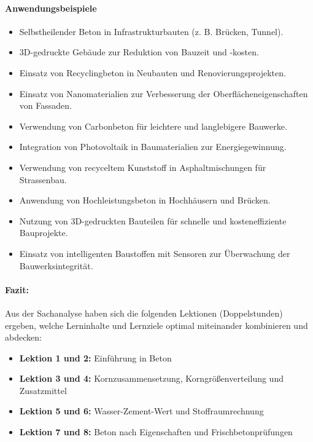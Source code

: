 \documentclass[
11pt,
captions=tableheading,
smallheadings,
headsepline,
footsepline, 
parskip=half-,
]{scrartcl}
\begin{document}
\paragraph{Anwendungsbeispiele}
\begin{itemize}
    \item Selbstheilender Beton in Infrastrukturbauten (z. B. Brücken, Tunnel).
    \item 3D-gedruckte Gebäude zur Reduktion von Bauzeit und -kosten.
    \item Einsatz von Recyclingbeton in Neubauten und Renovierungsprojekten.
    \item Einsatz von Nanomaterialien zur Verbesserung der Oberflächeneigenschaften von Fassaden.
    \item Verwendung von Carbonbeton für leichtere und langlebigere Bauwerke.
    \item Integration von Photovoltaik in Baumaterialien zur Energiegewinnung.
    \item Verwendung von recyceltem Kunststoff in Asphaltmischungen für Strassenbau.
    \item Anwendung von Hochleistungsbeton in Hochhäusern und Brücken.
    \item Nutzung von 3D-gedruckten Bauteilen für schnelle und kosteneffiziente Bauprojekte.
    \item Einsatz von intelligenten Baustoffen mit Sensoren zur Überwachung der Bauwerksintegrität.
\end{itemize}


\paragraph{Fazit:} Aus der Sachanalyse haben sich die folgenden Lektionen (Doppelstunden) ergeben, welche Lerninhalte und Lernziele optimal miteinander kombinieren und abdecken: 

\begin{itemize}[leftmargin=*, labelsep=0.5cm]
    \item \textbf{Lektion 1 und 2:} Einführung in Beton
    \item \textbf{Lektion 3 und 4:} Kornzusammensetzung, Korngrößenverteilung und Zusatzmittel
    \item \textbf{Lektion 5 und 6:} Wasser-Zement-Wert und Stoffraumrechnung
    \item \textbf{Lektion 7 und 8:} Beton nach Eigenschaften und Frischbetonprüfungen
\end{itemize}
\end{document}
